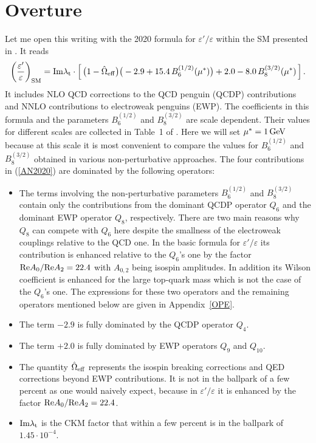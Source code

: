 \documentclass[12pt,a4paper]{article}
\newcommand{\IM}{{\rm Im}}
\newcommand{\RE}{{\rm Re}}
\newcommand{\gev}{\, {\rm GeV}}
\newcommand{\bsi}{B_6^{(1/2)}}
\newcommand{\bei}{B_8^{(3/2)}}
\def\epe{\varepsilon'/\varepsilon}
\begin{document}
\section{Overture}
Let me open this writing with the 2020 formula  
for $\epe$ within the SM presented in \cite{Aebischer:2020jto}. It reads
\begin{equation}
\left(\frac{\varepsilon'}{\varepsilon}\right)_{\text{SM}} =  
\IM\lambda_{\rm t}\cdot \left[\,
\big(1-\hat\Omega_{\rm eff}\big) \big(-2.9 + 15.4\,\bsi(\mu^*)\big) + 2.0 -8.0\,\bei(\mu^*) \,\right].
\label{AN2020}
\end{equation}
It includes NLO QCD corrections to the QCD penguin  (QCDP) contributions and NNLO contributions to electroweak penguins (EWP). The coefficients in this formula
and the parameters $\bsi$ and $\bei$ are scale dependent. Their values for
different scales are collected in Table~1 of \cite{Aebischer:2020jto}. Here
we will set  $\mu^*=1\gev$ because at this scale it is most convenient to compare
the values for $\bsi$ and $\bei$ obtained in various non-perturbative approaches.
The four contributions in (\ref{AN2020}) are dominated
by the  following operators:
\begin{itemize}
\item
  The terms involving the non-perturbative parameters $\bsi$  and $\bei$ 
contain only the contributions from the dominant QCDP  operator
$Q_6$ and the dominant EWP operator $Q_8$, respectively. There are two main reasons
why $Q_8$ can compete with $Q_6$ here despite the smallness of the electroweak couplings relative to the QCD one. In the basic formula for $\epe$ its contribution is 
enhanced relative to the $Q_6$'s one by the  factor ${\RE A_0/\RE A_2}=22.4$ with  $A_{0,2}$ being isospin amplitudes. In addition its Wilson coefficient is enhanced for the large top-quark mass which is not the case of the $Q_6$'s one. The expressions for
these two operators and the remaining operators mentioned below are given in Appendix~\ref{OPE}. 
\item
The term $-2.9$ is fully dominated by the QCDP operator $Q_4$.
\item
  The term $+2.0$ is fully dominated by EWP operators $Q_9$ and $Q_{10}$.
\item
  The quantity $\hat\Omega_{\rm eff}$ represents the isospin breaking corrections
  and QED corrections beyond EWP contributions. It is not in the ballpark of a few percent  as one
  would naively expect,  because in $\epe$ it is 
enhanced by the  factor ${\RE A_0/\RE A_2}=22.4$.
\item
${\IM\lambda_{\rm t}}$ is the CKM factor that within a few percent is in the ballpark of ${1.45\cdot 10^{-4}}$.
\end{itemize}
\end{document}
